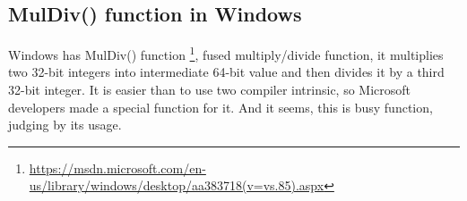 \subsection{MulDiv() function in Windows}

Windows has MulDiv() function
\footnote{\url{https://msdn.microsoft.com/en-us/library/windows/desktop/aa383718(v=vs.85).aspx}},
fused multiply/divide function, it multiplies two 32-bit integers into intermediate 64-bit value
and then divides it by a third 32-bit integer.
It is easier than to use two compiler intrinsic, so Microsoft developers made a special function for it.
And it seems, this is busy function, judging by its usage.

